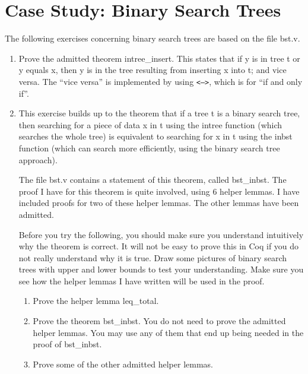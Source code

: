 \documentclass{book}[12pt]
\begin{document}
\section{Case Study: Binary Search Trees}
                                                                             
The following exercises concerning binary search trees are based on
the file bst.v.

\begin{enumerate}

\item Prove the admitted theorem intree\_insert.  This states that if y
is in tree t or y equals x, then y is in the tree resulting from
inserting x into t; and vice versa.  The ``vice versa'' is implemented
by using \texttt{<-->}, which is for ``if and only if''.

\item This exercise builds up to the theorem that if a tree t is a
binary search tree, then searching for a piece of data x in t using
the intree function (which searches the whole tree) is equivalent to
searching for x in t using the inbst function (which can search more
efficiently, using the binary search tree approach).
                                                                              
The file bst.v contains a statement of this theorem, called
bst\_inbst.  The proof I have for this theorem is quite involved,
using 6 helper lemmas.  I have included proofs for two of these helper
lemmas.  The other lemmas have been admitted.
                                                                              
Before you try the following, you should make sure you understand
intuitively why the theorem is correct.  It will not be easy to prove
this in Coq if you do not really understand why it is true.  Draw some
pictures of binary search trees with upper and lower bounds to test
your understanding.  Make sure you see how the helper lemmas I have
written will be used in the proof.

\begin{enumerate}                                                
\item Prove the helper lemma leq\_total.

\item Prove the theorem bst\_inbst.  You do not need to prove the
admitted helper lemmas.  You may use any of them that end up being
needed in the proof of bst\_inbst.
                                                                               
\item Prove some of the other admitted helper lemmas.

\end{enumerate}
\end{enumerate}
\end{document}
